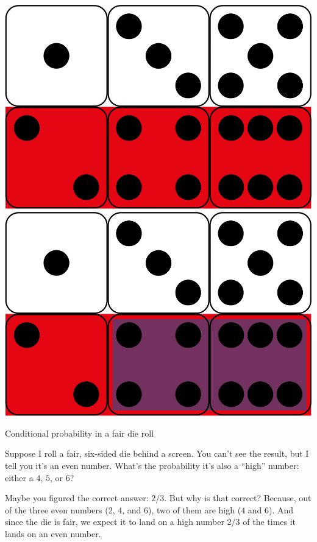 \documentclass[justified]{tufte-book}
\theoremstyle{definition}
\theoremstyle{definition}
\theoremstyle{definition}
\theoremstyle{remark}
\begin{document}
\begin{marginfigure}
\includegraphics{_main_files/figure-latex/unnamed-chunk-61-1} \includegraphics{_main_files/figure-latex/unnamed-chunk-61-2} \caption[Conditional probability in a fair die roll]{Conditional probability in a fair die roll}\label{fig:unnamed-chunk-61}
\end{marginfigure}

Suppose I roll a fair, six-sided die behind a screen. You can't see the result, but I tell you it's an even number. What's the probability it's also a ``high'' number: either a \(4\), \(5\), or \(6\)?

Maybe you figured the correct answer: \(2/3\). But why is that correct? Because, out of the three even numbers (\(2\), \(4\), and \(6\)), two of them are high (\(4\) and \(6\)). And since the die is fair, we expect it to land on a high number \(2/3\) of the times it lands on an even number.
\end{document}
